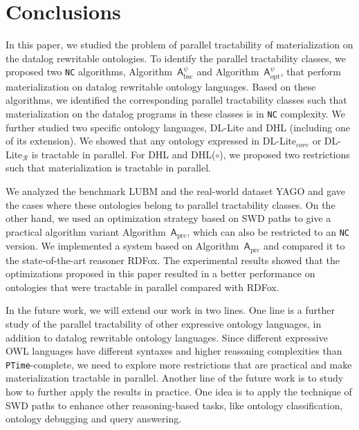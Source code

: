 \section{Conclusions}
\label{sec:conclusion}

In this paper, we studied the problem of parallel tractability of
materialization on the datalog rewritable ontologies.
To identify the parallel tractability classes,
we proposed two \texttt{NC} algorithms, Algorithm~$\mathsf{A}_{\text{bsc}}^\psi$
and Algorithm~$\mathsf{A}_{\text{opt}}^\psi$, that perform materialization on
datalog rewritable ontology languages.
Based on these algorithms, we identified the corresponding
parallel tractability classes such that materialization
on the datalog programs in these classes is in \texttt{NC} complexity.
We further studied two specific ontology languages, DL-Lite and DHL (including one of its extension).
We showed that any ontology expressed in DL-Lite$_{core}$ or DL-Lite$_{\mathcal{R}}$ is tractable in parallel.
For DHL and DHL($\circ$), we proposed two restrictions such that materialization is tractable in parallel.

We analyzed the benchmark LUBM and the real-world dataset YAGO
and gave the cases where these ontologies belong to parallel tractability classes.
On the other hand, we used an optimization strategy based on SWD paths
to give a practical algorithm variant Algorithm~$\mathsf{A}_{\text{prc}}$, which can
also be restricted to an \texttt{NC} version.
We implemented a system based on Algorithm~$\mathsf{A}_{\text{prc}}$ and compared it to
the state-of-the-art reasoner RDFox.
The experimental results showed that the optimizations proposed in this paper resulted in a
better performance on ontologies that were
tractable in parallel compared with RDFox.

In the future work, we will extend our work in two lines.
One line is a further study of the parallel tractability of
other expressive ontology languages, in addition to
datalog rewritable ontology languages. Since different expressive OWL languages
have different syntaxes and higher reasoning complexities than \texttt{PTime}-complete, we need to
explore more restrictions that are practical and make materialization
tractable in parallel. Another line of the future work is to
study how to further apply the
results in practice.
One idea is to apply the technique of SWD paths to enhance other reasoning-based tasks,
like ontology classification, ontology debugging and query answering.




